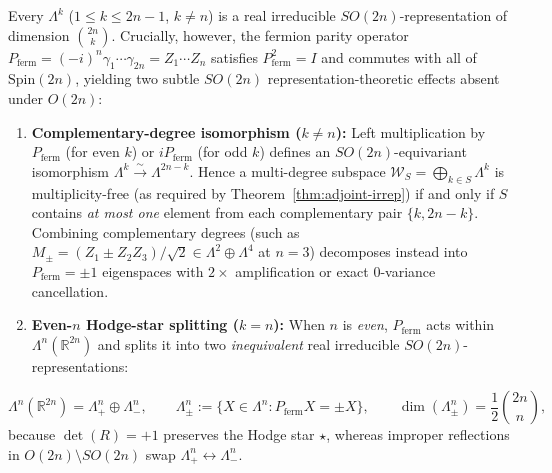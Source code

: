 \documentclass[11pt,a4paper]{article}
\theoremstyle{definition}
\theoremstyle{remark}
\newcommand{\RR}{\mathbb{R}}
\begin{document}
Every $\Lambda^k$ ($1 \le k \le 2n-1$, $k \ne n$) is a real irreducible $SO(2n)$-representation of dimension $\binom{2n}{k}$. Crucially, however, the fermion parity operator $P_{\mathrm{ferm}} = (-i)^n \gamma_1\cdots\gamma_{2n} = Z_1\cdots Z_n$ satisfies $P_{\mathrm{ferm}}^2 = I$ and commutes with all of $\mathrm{Spin}(2n)$, yielding two subtle $SO(2n)$ representation-theoretic effects absent under $O(2n)$:
\begin{enumerate}[leftmargin=1.8em,itemsep=2pt]
  \item \textbf{Complementary-degree isomorphism ($k \ne n$):} Left multiplication by $P_{\mathrm{ferm}}$ (for even $k$) or $i P_{\mathrm{ferm}}$ (for odd $k$) defines an $SO(2n)$-equivariant isomorphism $\Lambda^k \xrightarrow{\sim} \Lambda^{2n-k}$. Hence a multi-degree subspace $\mathcal{W}_S = \bigoplus_{k \in S} \Lambda^k$ is multiplicity-free (as required by Theorem~\ref{thm:adjoint-irrep}) if and only if $S$ contains \emph{at most one} element from each complementary pair $\{k, 2n-k\}$. Combining complementary degrees (such as $M_\pm = (Z_1 \pm Z_2 Z_3)/\sqrt{2} \in \Lambda^2 \oplus \Lambda^4$ at $n=3$) decomposes instead into $P_{\mathrm{ferm}} = \pm 1$ eigenspaces with $2\times$ amplification or exact $0$-variance cancellation.
  \item \textbf{Even-$n$ Hodge-star splitting ($k = n$):} When $n$ is \emph{even}, $P_{\mathrm{ferm}}$ acts within $\Lambda^n(\RR^{2n})$ and splits it into two \emph{inequivalent} real irreducible $SO(2n)$-representations:
\end{enumerate}
\begin{equation}\label{eq:hodge-split}
  \Lambda^n(\RR^{2n}) = \Lambda^n_+ \oplus \Lambda^n_-, \qquad
  \Lambda^n_\pm := \{X \in \Lambda^n : P_{\mathrm{ferm}} X = \pm X\}, \qquad
  \dim(\Lambda^n_\pm) = \frac{1}{2}\binom{2n}{n},
\end{equation}
because $\det(R) = +1$ preserves the Hodge star $\star$, whereas improper reflections in $O(2n)\setminus SO(2n)$ swap $\Lambda^n_+ \leftrightarrow \Lambda^n_-$.
\end{document}
